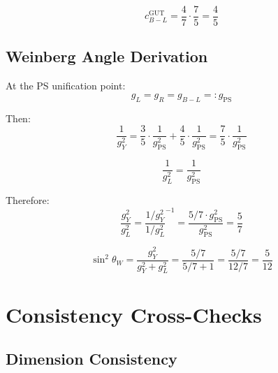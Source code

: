 \documentclass[11pt,a4paper]{article}
\theoremstyle{definition}
\begin{document}
\begin{equation}
\label{eq:cBL_final}
c_{B-L}^{\text{GUT}} = \frac{4}{7} \cdot \frac{7}{5} = \frac{4}{5}
\end{equation}

\subsection{Weinberg Angle Derivation}
\label{subsec:sw2_deriv}

At the PS unification point:
\begin{equation}
\label{eq:g_unified}
g_L = g_R = g_{B-L} =: g_{\text{PS}}
\end{equation}

Then:
\begin{equation}
\label{eq:gY_unified_deriv}
\frac{1}{g_Y^2} = \frac{3}{5} \cdot \frac{1}{g_{\text{PS}}^2} + \frac{4}{5} \cdot \frac{1}{g_{\text{PS}}^2} = \frac{7}{5} \cdot \frac{1}{g_{\text{PS}}^2}
\end{equation}

\begin{equation}
\label{eq:gL_unified_deriv}
\frac{1}{g_L^2} = \frac{1}{g_{\text{PS}}^2}
\end{equation}

Therefore:
\begin{equation}
\label{eq:ratio_deriv}
\frac{g_Y^2}{g_L^2} = \frac{1/g_Y^2}{1/g_L^2}^{-1} = \frac{5/7 \cdot g_{\text{PS}}^2}{g_{\text{PS}}^2} = \frac{5}{7}
\end{equation}

\begin{equation}
\label{eq:sw2_final_deriv}
\sin^2\theta_W = \frac{g_Y^2}{g_Y^2 + g_L^2} = \frac{5/7}{5/7 + 1} = \frac{5/7}{12/7} = \frac{5}{12}
\end{equation}

\section{Consistency Cross-Checks}
\label{app:consistency}

\subsection{Dimension Consistency}
\label{subsec:dim_consistency}
\end{document}
